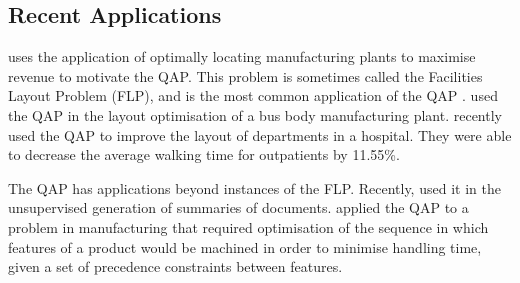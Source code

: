 \subsection{Recent Applications} {
    \label{sec:applications}

	\citeauthor{Koopmans:1957gf} uses the application of optimally locating manufacturing plants to maximise revenue to motivate the QAP. This problem is sometimes called the Facilities Layout Problem (FLP), and is the most common application of the QAP \citep{Loiola:2007jk}.
	\citet{Samanta:2015hk} used the QAP in the layout optimisation of a bus body manufacturing plant.
	\citet{XiongfengFeng:2015jo} recently used the QAP to improve the layout of departments in a hospital. They were able to decrease the average walking time for outpatients by 11.55\%.

	The QAP has applications beyond instances of the FLP.
	Recently, \citep{Alguliyev:2015jw} used it in the unsupervised generation of summaries of documents.
	\citet{Azab:2015eq} applied the QAP to a problem in manufacturing that required optimisation of the sequence in which features of a product would be machined in order to minimise handling time, given a set of precedence constraints between features.





}

